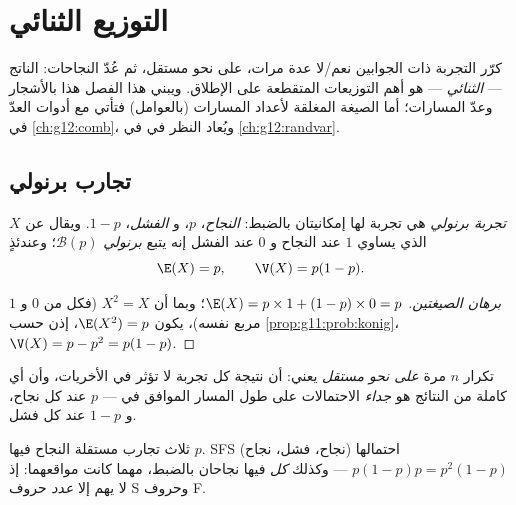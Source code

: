 \chapter{التوزيع الثنائي}\label{ch:g11:binom}

كرّر التجربة ذات الجوابين نعم/لا عدة مرات، على نحو مستقل، ثم عُدّ
النجاحات:  الناتج --- \emph{ الثنائي} --- هو
أهم التوزيعات المتقطعة على الإطلاق. ويبني هذا الفصل هذا 
بالأشجار وعدّ المسارات؛ أما الصيغة المغلقة لأعداد المسارات (بالعوامل)
فتأتي مع أدوات العدّ في \cref{ch:g12:comb}، ويُعاد النظر في
 في \cref{ch:g12:randvar}.

\section{تجارب برنولي}

\begin{definition}\label{def:g11:binom:bernoulli}
\emph{تجربة برنولي} هي تجربة لها
إمكانيتان بالضبط: \emph{النجاح}،  $p$، و
\emph{الفشل}،  $1 - p$. ويقال عن  $X$ الذي يساوي
$1$ عند النجاح و $0$ عند الفشل إنه يتبع
\emph{ برنولي} $\mathcal B(p)$؛ وعندئذٍ
\[
\E(X) = p,
\qquad
\V(X) = p(1 - p).
\]
\end{definition}

\begin{proof}[برهان الصيغتين]
$\E(X) = p \times 1 + (1-p) \times 0 = p$؛ وبما أن $X^2 = X$ (فكل من $0$
و $1$ مربع نفسه)، يكون $\E(X^2) = p$، إذن حسب
\cref{prop:g11:prob:konig}، $\V(X) = p - p^2 = p(1-p)$.
\end{proof}

\begin{definition}\label{def:g11:binom:repeated}
تكرار  $n$ مرة \emph{على نحو مستقل} يعني: أن
نتيجة كل تجربة لا تؤثر في الأخريات، وأن 
أي  كاملة من النتائج هو \emph{جداء}
الاحتمالات على طول المسار الموافق في  --- $p$ عند كل
نجاح، و $1 - p$ عند كل فشل.
\end{definition}

\begin{example}\label{ex:g11:binom:threetrials}
ثلاث تجارب مستقلة  النجاح فيها $p$.  SFS
(نجاح، فشل، نجاح) احتمالها $p(1-p)p = p^2(1-p)$ --- وكذلك
\emph{كل}  فيها نجاحان بالضبط، مهما كانت
مواقعهما: إذ لا يهم إلا \emph{عدد} حروف S وحروف F.
\end{example}

